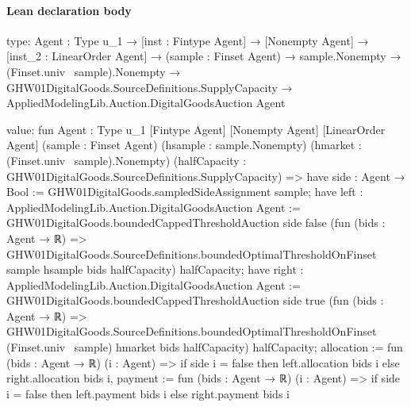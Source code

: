\documentclass[10pt]{article}
\begin{document}
\paragraph{Lean declaration body}
\begin{ReviewVerbatim}
type:
{Agent : Type u_1} →
  [inst : Fintype Agent] →
    [Nonempty Agent] →
      [inst_2 : LinearOrder Agent] →
        (sample : Finset Agent) →
          sample.Nonempty →
            (Finset.univ \ sample).Nonempty →
              GHW01DigitalGoods.SourceDefinitions.SupplyCapacity → AppliedModelingLib.Auction.DigitalGoodsAuction Agent

value:
fun {Agent : Type u_1} [Fintype Agent] [Nonempty Agent] [LinearOrder Agent] (sample : Finset Agent)
    (hsample : sample.Nonempty) (hmarket : (Finset.univ \ sample).Nonempty)
    (halfCapacity : GHW01DigitalGoods.SourceDefinitions.SupplyCapacity) =>
  have side : Agent → Bool := GHW01DigitalGoods.sampledSideAssignment sample;
  have left : AppliedModelingLib.Auction.DigitalGoodsAuction Agent :=
    GHW01DigitalGoods.boundedCappedThresholdAuction side false
      (fun (bids : Agent → ℝ) =>
        GHW01DigitalGoods.SourceDefinitions.boundedOptimalThresholdOnFinset sample hsample bids halfCapacity)
      halfCapacity;
  have right : AppliedModelingLib.Auction.DigitalGoodsAuction Agent :=
    GHW01DigitalGoods.boundedCappedThresholdAuction side true
      (fun (bids : Agent → ℝ) =>
        GHW01DigitalGoods.SourceDefinitions.boundedOptimalThresholdOnFinset (Finset.univ \ sample) hmarket bids
          halfCapacity)
      halfCapacity;
  {
    allocation := fun (bids : Agent → ℝ) (i : Agent) =>
      if side i = false then left.allocation bids i else right.allocation bids i,
    payment := fun (bids : Agent → ℝ) (i : Agent) =>
      if side i = false then left.payment bids i else right.payment bids i }
\end{ReviewVerbatim}
\end{document}
